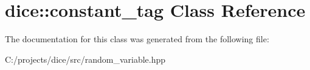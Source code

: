 \hypertarget{classdice_1_1constant__tag}{}\section{dice\+:\+:constant\+\_\+tag Class Reference}
\label{classdice_1_1constant__tag}


The documentation for this class was generated from the following file\+:\begin{DoxyCompactItemize}
\item 
C\+:/projects/dice/src/random\+\_\+variable.\+hpp\end{DoxyCompactItemize}
